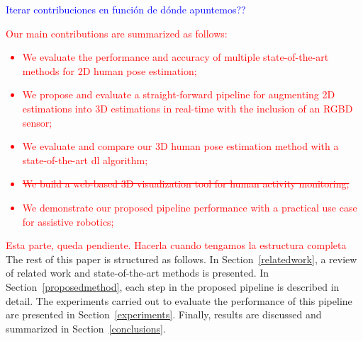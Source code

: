 \textcolor{blue}{Iterar contribuciones en función de dónde apuntemos??}

\textcolor{red}{
Our main contributions are summarized as follows:
\begin{itemize}[leftmargin=*,labelsep=5.8mm]
\item We evaluate the performance and accuracy of multiple state-of-the-art methods for 2D human pose estimation;
\item We propose and evaluate a straight-forward pipeline for augmenting 2D estimations into 3D estimations in real-time with the inclusion of an RGBD sensor;
\item We evaluate and compare our 3D human pose estimation method with a state-of-the-art \gls{dl} algorithm;
\item\sout{We build a web-based 3D visualization tool for human activity monitoring;}
\item We demonstrate our proposed pipeline performance with a practical use case for assistive robotics;
\end{itemize}
}

\textcolor{red}{Esta parte, queda pendiente. Hacerla cuando tengamos la estructura completa} The rest of this paper is structured as follows. In Section~\ref{relatedwork}, a review of related work and state-of-the-art methods is presented. In Section~\ref{proposedmethod}, each step in the proposed pipeline is described in detail. The experiments carried out to evaluate the performance of this pipeline are presented in Section~\ref{experiments}. Finally, results are discussed and summarized in Section~\ref{conclusions}.